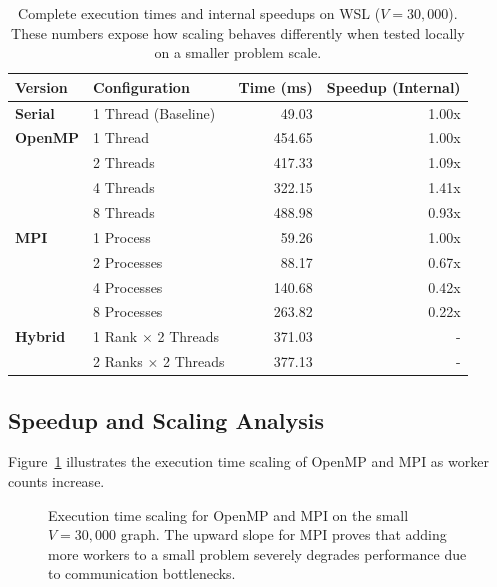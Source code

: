 \documentclass[12pt, a4paper]{article}
\begin{document}
\begin{table}[H]
\centering
\begin{tabular}{@{}llrr@{}}
\toprule
\textbf{Version} & \textbf{Configuration} & \textbf{Time (ms)} & \textbf{Speedup (Internal)} \\
\midrule
\textbf{Serial} & 1 Thread (Baseline) & 49.03 & 1.00x \\
\midrule
\textbf{OpenMP} & 1 Thread & 454.65 & 1.00x \\
& 2 Threads & 417.33 & 1.09x \\
& 4 Threads & 322.15 & 1.41x \\
& 8 Threads & 488.98 & 0.93x \\
\midrule
\textbf{MPI} & 1 Process & 59.26 & 1.00x \\
& 2 Processes & 88.17 & 0.67x \\
& 4 Processes & 140.68 & 0.42x \\
& 8 Processes & 263.82 & 0.22x \\
\midrule
\textbf{Hybrid} & 1 Rank $\times$ 2 Threads & 371.03 & - \\
& 2 Ranks $\times$ 2 Threads & 377.13 & - \\
\bottomrule
\end{tabular}
\caption{Complete execution times and internal speedups on WSL ($V=30,000$). These numbers expose how scaling behaves differently when tested locally on a smaller problem scale.}
\label{tab:complete_scaling}
\end{table}

\subsection{Speedup and Scaling Analysis}
Figure~\ref{fig:scaling_plot} illustrates the execution time scaling of OpenMP and MPI as worker counts increase.

\begin{figure}[H]
\centering
{}
\caption{Execution time scaling for OpenMP and MPI on the small $V=30,000$ graph. The upward slope for MPI proves that adding more workers to a small problem severely degrades performance due to communication bottlenecks.}
\label{fig:scaling_plot}
\end{figure}
\end{document}
